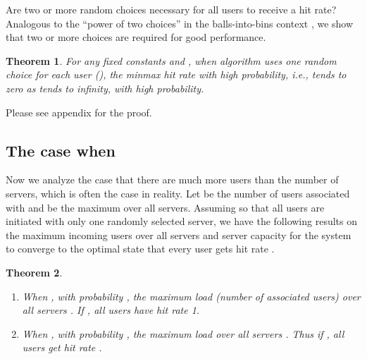 \documentclass[conference]{IEEEtran}
\newtheorem{theorem}{Theorem}
\newcommand{\comment}[1]{}
\begin{document}
Are two or more random choices necessary for all users to receive a  hit rate? Analogous to the ``power of two choices''  in the balls-into-bins context \cite{mitzenmacherRS2001}, we show that two or more choices are required for good performance. 
\begin{theorem}
\label{thm:onechoice}
For any fixed constants  and , when algorithm  uses one random choice for each user (), the minmax hit rate  with high probability, i.e.,   tends to zero as  tends to infinity, with high probability.  
\end{theorem}
Please see appendix for the proof.
\comment{
\begin{proof}
From the classical analysis of throwing  balls into  bins \cite{mitzenmacherRS2001}, we know that there exist a subset  such that   and all users in  have chosen a single server , with high probability. Now we show that some user in  must have a small hit rate with high probability. Let  represent the set of all objects accessed by all users in . The probability that  can be upper bounded as follows, where  is an arbitrarily slowly growing function of . The number of ways of picking  objects from a set  of  objects is at most . The probability that a user  in  will pick an object in  can be upper bounded by the probability that a user chooses one of the  most popular objects. Thus the probability that a user in  picks an object in   is at most , where  is the  generalized harmonic number and .Thus, the probability that all users in  pick objects in   is at most .  Therefore, the probability that  is at most

Thus, probability that  is small and hence , with high probability. Since the minmax hit rate  is at most  which is at most ,  tends to zero with high probability.
\end{proof}
}
\subsection{The case when }\label{sec:nu>ns}
Now we analyze the case that there are much more users than the number of servers, which is often the case in reality. 
Let  be the number of users associated with  and  be the maximum over all servers.  
Assuming  so that all users are initiated with only one randomly selected server, we have the following results on the maximum incoming users over all servers  and server capacity  for the system to converge to the optimal state that every user gets hit rate .
\begin{theorem}
\label{lem:nu>ns}
\begin{enumerate}
\item When , with probability ,  the maximum load (number of associated users) over all servers . If , all users have hit rate 1.\\
\item When , with probability , the maximum load over all servers . Thus if , all users get hit rate .
\end{enumerate}
\end{theorem}
\end{document}
